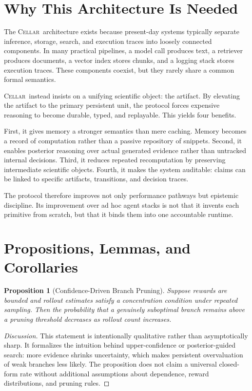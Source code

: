 \documentclass[11pt]{article}
\newtheorem{proposition}{Proposition}
\theoremstyle{definition}
\newcommand{\cellar}{\textsc{Cellar}}
\begin{document}
\section{Why This Architecture Is Needed}

The \cellar\ architecture exists because present-day systems typically separate inference, storage, search, and execution traces into loosely connected components. In many practical pipelines, a model call produces text, a retriever produces documents, a vector index stores chunks, and a logging stack stores execution traces. These components coexist, but they rarely share a common formal semantics.

\cellar\ instead insists on a unifying scientific object: the artifact. By elevating the artifact to the primary persistent unit, the protocol forces expensive reasoning to become durable, typed, and replayable. This yields four benefits.

First, it gives memory a stronger semantics than mere caching. Memory becomes a record of computation rather than a passive repository of snippets. Second, it enables posterior reasoning over actual generated evidence rather than untracked internal decisions. Third, it reduces repeated recomputation by preserving intermediate scientific objects. Fourth, it makes the system auditable: claims can be linked to specific artifacts, transitions, and decision traces.

The protocol therefore improves not only performance pathways but epistemic discipline. Its improvement over ad hoc agent stacks is not that it invents each primitive from scratch, but that it binds them into one accountable runtime.

\section{Propositions, Lemmas, and Corollaries}

\begin{proposition}[Confidence-Driven Branch Pruning]
Suppose rewards are bounded and rollout estimates satisfy a concentration condition under repeated sampling. Then the probability that a genuinely suboptimal branch remains above a pruning threshold decreases as rollout count increases.
\end{proposition}

\begin{proof}[Discussion]
This statement is intentionally qualitative rather than asymptotically sharp. It formalizes the intuition behind upper-confidence or posterior-guided search: more evidence shrinks uncertainty, which makes persistent overvaluation of weak branches less likely. The proposition does not claim a universal closed-form rate without additional assumptions about dependence, reward distributions, and pruning rules.
\end{proof}
\end{document}
